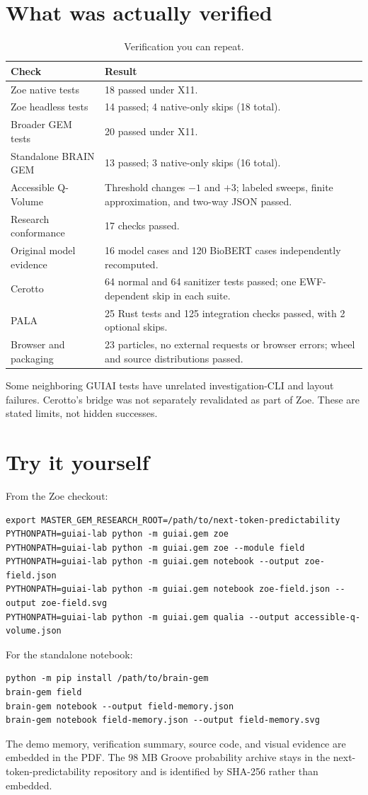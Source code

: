 \documentclass[11pt,a4paper]{article}
\begin{document}
\section{What was actually verified}
\begin{table}[htbp]
\centering
\caption{Verification you can repeat.}
\begin{tabular}{p{4.5cm}p{8cm}}
\toprule
Check & Result \\
\midrule
Zoe native tests & 18 passed under X11. \\
Zoe headless tests & 14 passed; 4 native-only skips (18 total). \\
Broader GEM tests & 20 passed under X11. \\
Standalone BRAIN GEM & 13 passed; 3 native-only skips (16 total). \\
Accessible Q-Volume & Threshold changes $-1$ and $+3$; labeled sweeps, finite approximation, and two-way JSON passed. \\
Research conformance & 17 checks passed. \\
Original model evidence & 16 model cases and 120 BioBERT cases independently recomputed. \\
Cerotto & 64 normal and 64 sanitizer tests passed; one EWF-dependent skip in each suite. \\
PALA & 25 Rust tests and 125 integration checks passed, with 2 optional skips. \\
Browser and packaging & 23 particles, no external requests or browser errors; wheel and source distributions passed. \\
\bottomrule
\end{tabular}
\end{table}

Some neighboring GUIAI tests have unrelated investigation-CLI and layout failures. Cerotto's bridge was not separately revalidated as part of Zoe. These are stated limits, not hidden successes.

\section{Try it yourself}
From the Zoe checkout:
\begin{lstlisting}
export MASTER_GEM_RESEARCH_ROOT=/path/to/next-token-predictability
PYTHONPATH=guiai-lab python -m guiai.gem zoe
PYTHONPATH=guiai-lab python -m guiai.gem zoe --module field
PYTHONPATH=guiai-lab python -m guiai.gem notebook --output zoe-field.json
PYTHONPATH=guiai-lab python -m guiai.gem notebook zoe-field.json --output zoe-field.svg
PYTHONPATH=guiai-lab python -m guiai.gem qualia --output accessible-q-volume.json
\end{lstlisting}
For the standalone notebook:
\begin{lstlisting}
python -m pip install /path/to/brain-gem
brain-gem field
brain-gem notebook --output field-memory.json
brain-gem notebook field-memory.json --output field-memory.svg
\end{lstlisting}
The demo memory, verification summary, source code, and visual evidence are embedded in the PDF. The 98 MB Groove probability archive stays in the next-token-predictability repository and is identified by SHA-256 rather than embedded.
\end{document}

